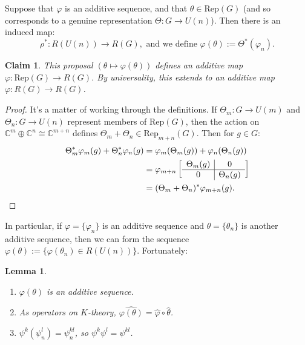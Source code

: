 \documentclass{article}
\newcommand{\C}{\mathbb{C}}
\newcommand{\from}{\leftarrow}
\newtheorem{lem}[thm]{Lemma}
\newtheorem{claim}[thm]{Claim}
\begin{document}
%
Suppose that $\varphi$ is an additive sequence, and that $\theta\in \mathrm{Rep}(G)$ (and so corresponds to a genuine representation $\Theta:G\to U(n)$). Then there is an induced map:
\[\rho^*:R(U(n))\to R(G),\text{ and we define }\varphi(\theta):=\Theta^*(\varphi_{n}).\]

\begin{claim}
This proposal $(\theta\mapsto \varphi(\theta))$ defines an additive map $\varphi:\mathrm{Rep}(G) \to R(G)$. By universality, this extends to an additive map $\varphi:R(G)\to R(G)$.
\end{claim}
\begin{proof}
It's a matter of working through the definitions.  If $\Theta_m: G \to U(m)$ and $\Theta_n: G \to U(n)$ represent members of $\mathrm{Rep}(G)$, then the action on $\C^m \oplus \C^n \cong \C^{m+n}$ defines $\Theta_m + \Theta_n \in \mathrm{Rep}_{m+n}(G)$.  Then for $g\in G$:
\begin{align*}
\Theta^*_m \varphi_m(g) + \Theta_n^* \varphi_n(g) & = \varphi_m(\Theta_m (g)) + \varphi_n(\Theta_n (g)) \\
& = \varphi_{m+n} \left[ \begin{array}{c|c} \Theta_m (g) & 0 \\ \hline 0 & \Theta_n (g) \end{array} \right] \\
& = (\Theta_m + \Theta_n)^* \varphi_{m+n} (g).\qedhere
\end{align*}
\end{proof}
\noindent In particular, if $\varphi = \{\varphi_n\}$ is an additive sequence and $\theta = \{ \theta_n \}$ is another additive sequence, then we can form the sequence $\varphi(\theta) := \{ \varphi(\theta_n) \in R(U(n))\}$. Fortunately:
\begin{lem}\hfil
\begin{enumerate}
\item[\textup{1}.] $\varphi(\theta)$ is an additive sequence.
\item[\textup{2}.] As operators on $K$-theory, $\widehat{\varphi(\theta)} = \hat \varphi \circ \hat \theta$.
\item[\textup{3}.] $\psi^k(\psi^l_n) = \psi^{kl}_n$, so $\psi^k \psi^l = \psi^{kl}$.
\end{enumerate}
\end{lem}
\end{document}
